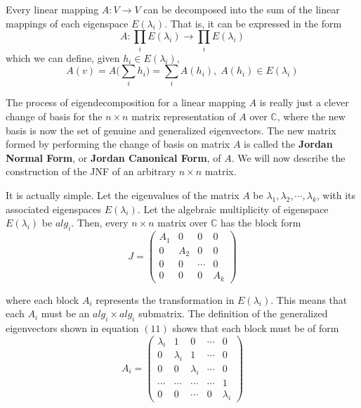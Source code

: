   \begin{corollary}
    Every linear mapping $A: V \longrightarrow V$ can be decomposed into the sum of the linear mappings of each eigenspace $E(\lambda_i)$. That is, it can be expressed in the form 
    \[A: \prod_i E(\lambda_i) \longrightarrow \prod_i E(\lambda_i)\]
    which we can define, given $h_i \in E(\lambda_i)$, 
    \[A(v) = A\bigg(\sum_i h_i \bigg) = \sum_i A(h_i), \; A(h_i) \in E(\lambda_i) \]
  \end{corollary}

  The process of eigendecomposition for a linear mapping $A$ is really just a clever change of basis for the $n \times n$ matrix representation of $A$ over $\mathbb{C}$, where the new basis is now the set of genuine and generalized eigenvectors. The new matrix formed by performing the change of basis on matrix $A$ is called the \textbf{Jordan Normal Form}, or \textbf{Jordan Canonical Form}, of $A$. We will now describe the construction of the JNF of an arbitrary $n \times n$ matrix. 

  It is actually simple. Let the eigenvalues of the matrix $A$ be $\lambda_1, \lambda_2, \cdots, \lambda_k$, with its associated eigenspaces $E(\lambda_i)$. Let the algebraic multiplicity of eigenspace $E(\lambda_i)$ be $alg_i$. Then, every $n \times n$ matrix over $\mathbb{C}$ has the block form 
  \begin{equation}
    J = \begin{pmatrix}
      A_1&0&0&0\\
      0&A_2&0&0\\
      0&0&\cdots&0\\
      0&0&0&A_k
    \end{pmatrix}
  \end{equation}

  where each block $A_i$ represents the transformation in $E(\lambda_i)$. This means that each $A_i$ must be an $alg_i \times alg_i$ submatrix. The definition of the generalized eigenvectors shown in equation $(11)$ shows that each block must be of form 
  \begin{equation}
    A_i = \begin{pmatrix}
      \lambda_i & 1 & 0 & \cdots & 0\\
      0 &\lambda_i & 1 &\cdots&0 \\
      0&0&\lambda_i&\cdots&0\\
      \cdots&\cdots&\cdots&\cdots&1\\
      0&0&\cdots&0&\lambda_i
    \end{pmatrix}
  \end{equation}

